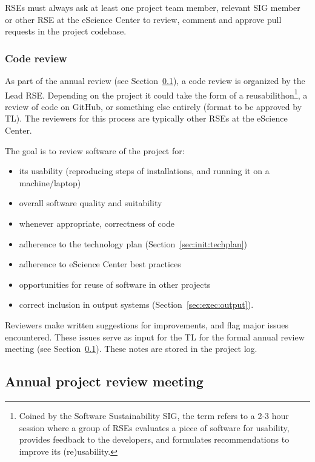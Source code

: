 RSEs must always ask at least one project team member, relevant SIG member or other RSE at the eScience Center to
review, comment and approve pull requests in the project codebase.

\subsubsection{Code review}
As part of the annual review (see Section~\ref{sec:exec:annual}), a code review is organized by the Lead RSE. Depending
on the project it could take the form of a reusabilithon\footnote{Coined by the Software Sustainability SIG, the term refers to a 2-3 hour session where a group of RSEs evaluates a piece of software for usability, provides feedback to the developers, and formulates recommendations to improve its (re)usability.}, a review of code on GitHub, or
something else entirely (format to be approved by TL). The reviewers for this process are typically other RSEs at the
eScience Center.


The goal is to review software of the project for:
\begin{itemize}\itemsep0em
\item its usability (reproducing steps of installations, and running it on a machine/laptop)
\item overall software quality and suitability
\item whenever appropriate, correctness of code
\item adherence to the technology plan (Section~\ref{sec:init:techplan})
\item adherence to eScience Center best practices
\item opportunities for reuse of software in other projects
\item correct inclusion in output systems (Section~\ref{sec:exec:output}).
\end{itemize}

Reviewers make written suggestions for improvements, and flag major issues encountered. These issues serve as input for
the TL for the formal annual review meeting (see Section~\ref{sec:exec:annual}). These notes are stored in the project log. 

\subsection{Annual project review meeting}
\label{sec:exec:annual}

\let\myhcolw\relax %
\newlength{\myhcolw}
\setlength{\myhcolw}{0.75\textwidth}

